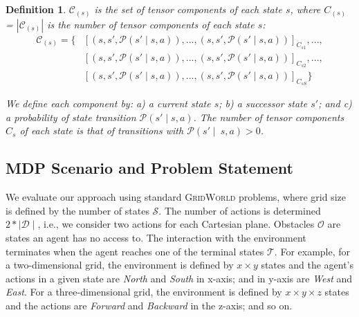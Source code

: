 \documentclass[letterpaper]{article} %
\newcommand\gridworld{\textsc{GridWorld}}
\newtheorem{definition}{Definition}
\begin{document}
\begin{definition}\label{def:tensor-components}
$\mathcal{C}_{(s)}$ is the set of tensor components of each state $s$, where $C_{(s)}$ = $|\mathcal{C}_{(s)}|$ is the number of tensor components of each state $s$:
\begin{align*}
\mathcal{C}_{(s)} =  
\{ & 
[(s, s', \mathcal{P}(s'\mid s,a)), ... , (s, s', \mathcal{P}(s'\mid s,a))]_{C_{s1}},  ..., \\
& [(s, s', \mathcal{P}(s'\mid s,a)), ... , (s, s', \mathcal{P}(s'\mid s,a))]_{C_{s2}},  ..., \\
& [(s, s', \mathcal{P}(s' \mid s,a)), ..., (s, s', \mathcal{P}(s'\mid s,a))]_{C_{sS}} \} 
\end{align*}

We define each component by: a) a current state $s$; b) a successor state $s'$; and c) a probability of state transition $\mathcal{P}(s'\mid s,a)$.
% 
The number of tensor components $C_s$ of each state is that of transitions with $\mathcal{P}(s'\mid~s,a) > 0$.
\end{definition}


\subsection{MDP Scenario and Problem Statement}

We evaluate our approach using standard \gridworld{} problems, where grid size is defined by the number of states $\mathcal{S}$. 
The number of actions is determined $2*\mid\mathcal{D}\mid$, i.e., we consider two actions for each Cartesian plane.
Obstacles $\mathcal{O}$ are states an agent has no access to.  
The interaction with the environment terminates when the agent reaches one of the terminal states $\mathcal{T}$.
%
For example, for a two-dimensional grid, the environment is defined by $x \times y$ states and the agent's actions in a given state are \textit{North} and \textit{South} in x-axis; and in y-axis are \textit{West} and \textit{East}. 
For a three-dimensional grid, the environment is defined by $x \times y \times z$ states and the actions are \textit{Forward} and \textit{Backward} in the z-axis; and so on. 
\end{document}
